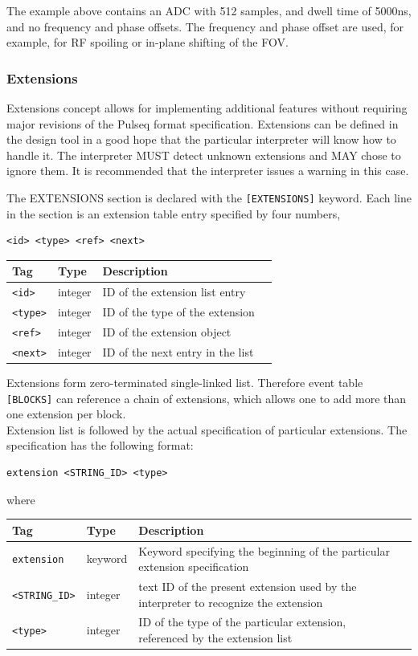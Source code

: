 \documentclass{article}
\begin{document}
The example above contains an ADC with 512 samples, and dwell time of 5000ns, and no frequency and phase offsets. The frequency and phase offset are used, for example, for RF spoiling or in-plane shifting of the FOV.

\subsubsection{Extensions}
Extensions concept allows for implementing additional features without requiring major revisions of the Pulseq format specification. Extensions can be defined in the design tool in a good hope that the particular interpreter will know how to handle it. The interpreter MUST detect unknown extensions and MAY chose to ignore them. It is recommended that the interpreter issues a warning in this case. 

The EXTENSIONS section is declared with the \verb.[EXTENSIONS]. keyword. Each line in the section is an extension table entry specified by four numbers,
\begin{lstlisting}
<id> <type> <ref> <next>
\end{lstlisting}

\begin{tabularx}{\textwidth}{llXl}
\toprule
Tag & Type & Description \\
\midrule
\verb.<id>. & integer & ID of the extension list entry \\
\verb.<type>. & integer & ID of the type of the extension \\
\verb.<ref>. & integer & ID of the extension object \\
\verb.<next>. & integer & ID of the next entry in the list \\
\bottomrule
\end{tabularx}

Extensions form zero-terminated single-linked list. Therefore event table \verb.[BLOCKS]. can reference a chain of extensions, which allows one to add more than one extension per block. \\

Extension list is followed by the actual specification of particular extensions. The specification has the following format:

\begin{lstlisting}
extension <STRING_ID> <type>
\end{lstlisting}

where 

\begin{tabularx}{\textwidth}{llXl}
\toprule
Tag & Type & Description \\
\midrule
\verb.extension. & keyword & Keyword specifying the beginning of the particular extension specification \\
\verb.<STRING_ID>. & integer & text ID of the present extension used by the interpreter to recognize the extension \\
\verb.<type>. & integer & ID of the type of the particular extension, referenced by the extension list \\
\bottomrule
\end{tabularx}
\end{document}
